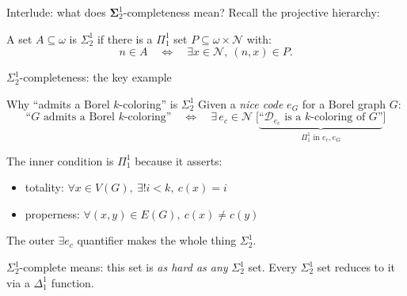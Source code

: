 \documentclass[aspectratio=169, 12pt]{beamer}
\newcommand{\NN}{\mathcal{N}}
\begin{document}
\begin{frame}{Interlude: what does $\mathbf\Sigma^1_2$-completeness mean?}
Recall the \alert{projective hierarchy}:

\medskip

\begin{center}
\end{center}

\medskip

A set $A \subseteq \omega$ is \alert{$\Sigma^1_2$} if there is a $\Pi^1_1$ set $P \subseteq \omega \times \NN$ with:
$$
n \in A \quad\Longleftrightarrow\quad \exists x \in \NN,\ (n,x) \in P.
$$

\end{frame}

\begin{frame}{$\Sigma^1_2$-completeness: the key example}
\begin{block}{Why ``admits a Borel $k$-coloring'' is $\Sigma^1_2$}
Given a \emph{nice code} $e_G$ for a Borel graph $G$:
$$
\text{``$G$ admits a Borel $k$-coloring''}
\quad\Longleftrightarrow\quad
\exists\, e_c \in \mathcal N\; \bigl[\underbrace{\text{``$\mathcal{D}_{e_c}$ is a $k$-coloring of $G$''}}_{\Pi^1_1 \text{ in } e_c, e_G}\bigr]
$$
\end{block}

\pause
\medskip

The inner condition is $\Pi^1_1$ because it asserts:
\begin{itemize}
	\item totality: $\forall x \in V(G),\ \exists! i < k,\ c(x) = i$ \quad [$\Pi^1_1$]
	\item properness: $\forall (x,y) \in E(G),\ c(x) \neq c(y)$ \quad [$\Pi^1_1$]
\end{itemize}

\medskip

The outer $\exists e_c$ quantifier makes the whole thing $\Sigma^1_2$.

\pause
\medskip

\alert{$\Sigma^1_2$-complete} means: this set is \emph{as hard as any} $\Sigma^1_2$ set. Every $\Sigma^1_2$ set reduces to it via a $\Delta^1_1$ function.
\end{frame}
\end{document}
